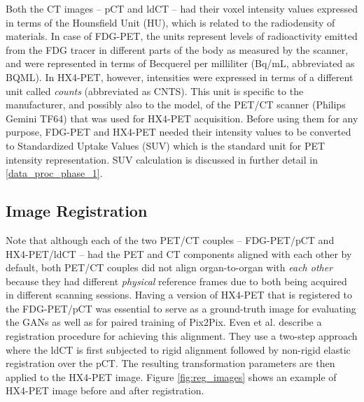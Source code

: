 Both the CT images -- pCT and ldCT -- had their voxel intensity values expressed in terms of the Hounsfield Unit (HU), which is related to the radiodensity of materials. In case of FDG-PET, the units represent levels of radioactivity emitted from the FDG tracer in different parts of the body as measured by the scanner, and were represented in terms of Becquerel per milliliter (Bq/mL, abbreviated as BQML). In HX4-PET, however, intensities were expressed in terms of a different unit called \textit{counts} (abbreviated as CNTS). This unit is specific to the manufacturer, and possibly also to the model, of the PET/CT scanner (Philips Gemini TF64) that was used for HX4-PET acquisition. Before using them for any purpose, FDG-PET and HX4-PET needed their intensity values to be converted to Standardized Uptake Values (SUV) which is the standard unit for PET intensity representation. SUV calculation is discussed in further detail in \ref{data_proc_phase_1}.


\subsection{Image Registration}
Note that although each of the two PET/CT couples -- FDG-PET/pCT and HX4-PET/ldCT -- had the PET and CT components aligned with each other by default, both PET/CT couples did not align organ-to-organ with \textit{each other} because they had different \textit{physical} reference frames due to both being acquired in different scanning sessions. Having a version of HX4-PET that is registered to the FDG-PET/pCT was essential to serve as a ground-truth image for evaluating the GANs as well as for paired training of Pix2Pix. Even et al. \cite{even2017predicting} describe a registration procedure for achieving this alignment. They use a two-step approach where the ldCT is first subjected to rigid alignment followed by non-rigid elastic registration over the pCT. The resulting transformation parameters are then applied to the HX4-PET image. Figure \ref{fig:reg_images} shows an example of HX4-PET image before and after registration. 

